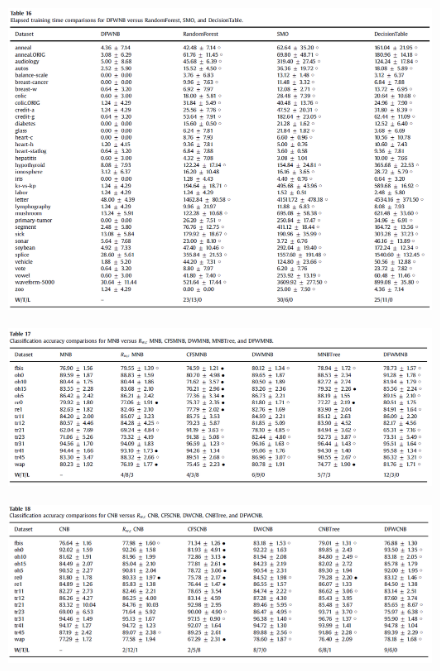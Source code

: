 \documentclass[12pt, a4paper]{article}
\begin{document}
\begin{figure}
    \centering
    \includegraphics[width=\linewidth]{images/article1/table16.png}
    \caption{}
    \label{a1_table16}
\end{figure}
\begin{figure}
    \centering
    \includegraphics[width=\linewidth]{images/article1/table17.png}
    \caption{}
    \label{a1_table17}
\end{figure}

\clearpage

\begin{figure}
    \centering
    \includegraphics[width=\linewidth]{images/article1/table18.png}
    \caption{}
    \label{a1_table18}
\end{figure}
\end{document}
